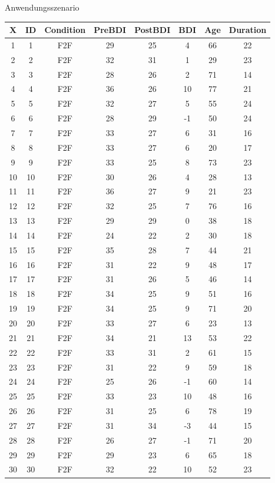\documentclass[
  8pt,
  ignorenonframetext,
]{beamer}
\begin{document}
\begin{frame}[fragile]{Anwendungsszenario}
\begin{longtable}[]{@{}cccccccc@{}}
\toprule
X & ID & Condition & PreBDI & PostBDI & BDI & Age & Duration \\
\midrule
\endhead
1 & 1 & F2F & 29 & 25 & 4 & 66 & 22 \\
2 & 2 & F2F & 32 & 31 & 1 & 29 & 23 \\
3 & 3 & F2F & 28 & 26 & 2 & 71 & 14 \\
4 & 4 & F2F & 36 & 26 & 10 & 77 & 21 \\
5 & 5 & F2F & 32 & 27 & 5 & 55 & 24 \\
6 & 6 & F2F & 28 & 29 & -1 & 50 & 24 \\
7 & 7 & F2F & 33 & 27 & 6 & 31 & 16 \\
8 & 8 & F2F & 33 & 27 & 6 & 20 & 17 \\
9 & 9 & F2F & 33 & 25 & 8 & 73 & 23 \\
10 & 10 & F2F & 30 & 26 & 4 & 28 & 13 \\
11 & 11 & F2F & 36 & 27 & 9 & 21 & 23 \\
12 & 12 & F2F & 32 & 25 & 7 & 76 & 16 \\
13 & 13 & F2F & 29 & 29 & 0 & 38 & 18 \\
14 & 14 & F2F & 24 & 22 & 2 & 30 & 18 \\
15 & 15 & F2F & 35 & 28 & 7 & 44 & 21 \\
16 & 16 & F2F & 31 & 22 & 9 & 48 & 17 \\
17 & 17 & F2F & 31 & 26 & 5 & 46 & 14 \\
18 & 18 & F2F & 34 & 25 & 9 & 51 & 16 \\
19 & 19 & F2F & 34 & 25 & 9 & 71 & 20 \\
20 & 20 & F2F & 33 & 27 & 6 & 23 & 13 \\
21 & 21 & F2F & 34 & 21 & 13 & 53 & 22 \\
22 & 22 & F2F & 33 & 31 & 2 & 61 & 15 \\
23 & 23 & F2F & 31 & 22 & 9 & 59 & 18 \\
24 & 24 & F2F & 25 & 26 & -1 & 60 & 14 \\
25 & 25 & F2F & 33 & 23 & 10 & 48 & 16 \\
26 & 26 & F2F & 31 & 25 & 6 & 78 & 19 \\
27 & 27 & F2F & 31 & 34 & -3 & 44 & 15 \\
28 & 28 & F2F & 26 & 27 & -1 & 71 & 20 \\
29 & 29 & F2F & 29 & 23 & 6 & 65 & 18 \\
30 & 30 & F2F & 32 & 22 & 10 & 52 & 23 \\

\end{longtable}
\end{frame}
\end{document}

